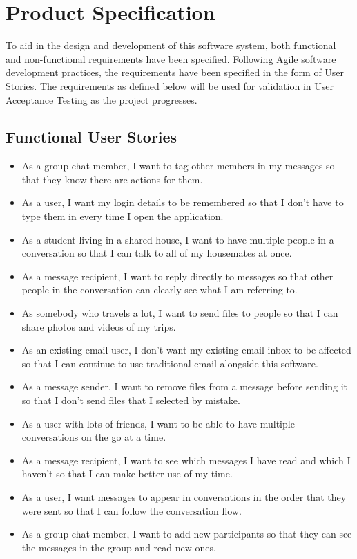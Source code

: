 \chapter{Product Specification}

To aid in the design and development of this software system, both functional and non-functional requirements have been specified. Following Agile software development practices, the requirements have been specified in the form of User Stories. The requirements as defined below will be used for validation in User Acceptance Testing as the project progresses.

\section{Functional User Stories}\label{sec:functional-spec}
\begin{itemize}
  \item As a group-chat member, I want to tag other members in my messages so that they know there are actions for them.
  \item As a user, I want my login details to be remembered so that I don't have to type them in every time I open the application.
  \item As a student living in a shared house, I want to have multiple people in a conversation so that I can talk to all of my housemates at once.
  \item As a message recipient, I want to reply directly to messages so that other people in the conversation can clearly see what I am referring to.
  \item As somebody who travels a lot, I want to send files to people so that I can share photos and videos of my trips.
  \item As an existing email user, I don't want my existing email inbox to be affected so that I can continue to use traditional email alongside this software.
  \item As a message sender, I want to remove files from a message before sending it so that I don't send files that I selected by mistake.
  \item As a user with lots of friends, I want to be able to have multiple conversations on the go at a time.
  \item As a message recipient, I want to see which messages I have read and which I haven't so that I can make better use of my time.
  \item As a user, I want messages to appear in conversations in the order that they were sent so that I can follow the conversation flow.
  \item As a group-chat member, I want to add new participants so that they can see the messages in the group and read new ones.
\end{itemize}

